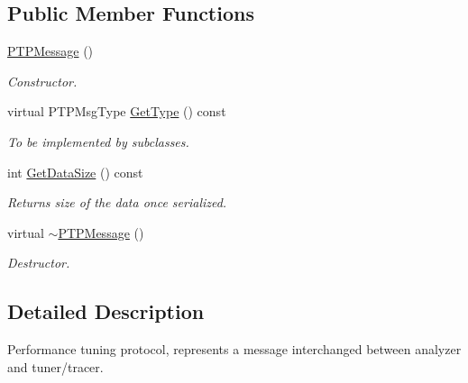 \subsection*{Public Member Functions}
\begin{DoxyCompactItemize}
\item 
\hypertarget{class_common_1_1_p_t_p_message_a1a7568792ffddbe05beba780dc13d608}{\hyperlink{class_common_1_1_p_t_p_message_a1a7568792ffddbe05beba780dc13d608}{P\-T\-P\-Message} ()}\label{class_common_1_1_p_t_p_message_a1a7568792ffddbe05beba780dc13d608}

\begin{DoxyCompactList}\small\item\em Constructor. \end{DoxyCompactList}\item 
\hypertarget{class_common_1_1_p_t_p_message_a0400ff9945ee7f33ddc15baf25771997}{virtual P\-T\-P\-Msg\-Type \hyperlink{class_common_1_1_p_t_p_message_a0400ff9945ee7f33ddc15baf25771997}{Get\-Type} () const }\label{class_common_1_1_p_t_p_message_a0400ff9945ee7f33ddc15baf25771997}

\begin{DoxyCompactList}\small\item\em To be implemented by subclasses. \end{DoxyCompactList}\item 
\hypertarget{class_common_1_1_p_t_p_message_acfbc6798267f71ee93eea878d201973a}{int \hyperlink{class_common_1_1_p_t_p_message_acfbc6798267f71ee93eea878d201973a}{Get\-Data\-Size} () const }\label{class_common_1_1_p_t_p_message_acfbc6798267f71ee93eea878d201973a}

\begin{DoxyCompactList}\small\item\em Returns size of the data once serialized. \end{DoxyCompactList}\item 
\hypertarget{class_common_1_1_p_t_p_message_ad864518e8c0dc31c38a926909c6fb85e}{virtual \hyperlink{class_common_1_1_p_t_p_message_ad864518e8c0dc31c38a926909c6fb85e}{$\sim$\-P\-T\-P\-Message} ()}\label{class_common_1_1_p_t_p_message_ad864518e8c0dc31c38a926909c6fb85e}

\begin{DoxyCompactList}\small\item\em Destructor. \end{DoxyCompactList}\end{DoxyCompactItemize}


\subsection{Detailed Description}
Performance tuning protocol, represents a message interchanged between analyzer and tuner/tracer. 

